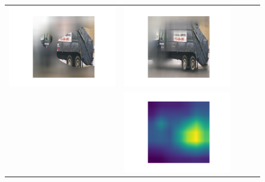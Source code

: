 \begin{figure}[t]
\begin{tabular}{ccccc}
	\includegraphics[trim={28mm 10mm 39mm 10mm},clip,width=\sizeS\linewidth]{fig/7_207/blurry_image.png} &
	\includegraphics[trim={28mm 10mm 39mm 10mm},clip,width=\sizeS\linewidth]{fig/7_207/zip.png} \\
	\rotatebox{90}{~Attribution} &
	\includegraphics[trim={28mm 10mm 39mm 10mm},clip,width=\sizeS\linewidth]{fig/7_207/0.png} &

\end{tabular}
\end{figure}
